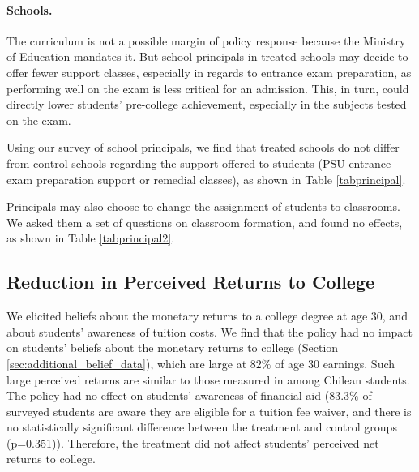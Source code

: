  \paragraph{Schools.} The curriculum is not a possible margin of policy response because the Ministry of Education mandates it. But school principals in treated schools may decide to offer fewer support classes, especially in regards to entrance exam preparation, as performing well on the exam is less critical for an admission. This, in turn, could directly lower students' pre-college achievement, especially in the subjects tested on the exam.\par 
 Using our survey of school principals, we find that treated schools do not differ from control schools regarding the support offered to students (PSU entrance exam preparation support or remedial classes), as shown in Table \ref{tabprincipal}. \par
 Principals may also choose to change the assignment of students to classrooms. We asked them a set of questions on classroom formation, and found no effects, as shown in Table \ref{tabprincipal2}.\par 

 

    

\subsection{Reduction in Perceived Returns to College}\label{sec:perceived_returns}


We elicited beliefs about the monetary returns to a college degree at age 30, and about students' awareness of tuition costs. We find that the policy had no impact on students' beliefs about the monetary returns to college (Section \ref{sec:additional_belief_data}), which are large at $82\%$ of age 30 earnings. Such large perceived returns are similar to those measured in \citealp*{hastings2016informed} among Chilean students. The policy had no effect on students' awareness of financial aid ($83.3\%$ of surveyed students are aware they are eligible for a tuition fee waiver, and there is no statistically significant difference between the treatment and control groups (p=0.351)). Therefore, the treatment did not affect students' perceived net returns to college.

    
